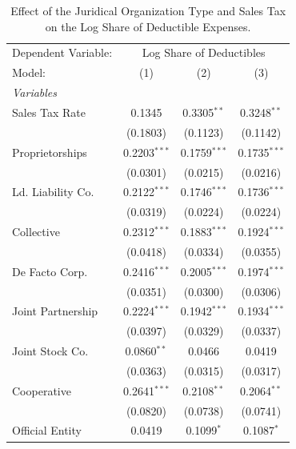 \documentclass[
  12pt]{article}
\theoremstyle{definition}
\theoremstyle{remark}
\begin{document}
\begin{table}

\caption{\label{tbl-reg-ded}Effect of the Juridical Organization Type
and Sales Tax on the Log Share of Deductible Expenses.}

\begin{minipage}{\linewidth}

\begingroup
\centering
\begin{tabular}{lccc}
   \tabularnewline \midrule \midrule
   Dependent Variable: & \multicolumn{3}{c}{Log Share of Deductibles}\\
   Model:            & (1)            & (2)            & (3)\\  
   \midrule
   \emph{Variables}\\
   Sales Tax Rate    & 0.1345         & 0.3305$^{**}$  & 0.3248$^{**}$\\   
                     & (0.1803)       & (0.1123)       & (0.1142)\\   
   Proprietorships   & 0.2203$^{***}$ & 0.1759$^{***}$ & 0.1735$^{***}$\\   
                     & (0.0301)       & (0.0215)       & (0.0216)\\   
   Ld. Liability Co. & 0.2122$^{***}$ & 0.1746$^{***}$ & 0.1736$^{***}$\\   
                     & (0.0319)       & (0.0224)       & (0.0224)\\   
   Collective        & 0.2312$^{***}$ & 0.1883$^{***}$ & 0.1924$^{***}$\\   
                     & (0.0418)       & (0.0334)       & (0.0355)\\   
   De Facto Corp.    & 0.2416$^{***}$ & 0.2005$^{***}$ & 0.1974$^{***}$\\   
                     & (0.0351)       & (0.0300)       & (0.0306)\\   
   Joint Partnership & 0.2224$^{***}$ & 0.1942$^{***}$ & 0.1934$^{***}$\\   
                     & (0.0397)       & (0.0329)       & (0.0337)\\   
   Joint Stock Co.   & 0.0860$^{**}$  & 0.0466         & 0.0419\\   
                     & (0.0363)       & (0.0315)       & (0.0317)\\   
   Cooperative       & 0.2641$^{***}$ & 0.2108$^{**}$  & 0.2064$^{**}$\\   
                     & (0.0820)       & (0.0738)       & (0.0741)\\   
   Official Entity   & 0.0419         & 0.1099$^{*}$   & 0.1087$^{*}$\\   

\end{tabular}
\end{minipage}
\end{table}
\end{document}
